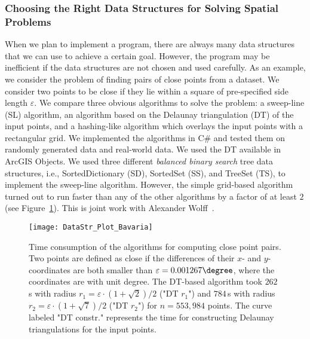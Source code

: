 \subsubsection{Choosing the Right Data Structures for Solving 
Spatial Problems}

When we plan to implement a program, 
there are always many data structures that
we can use to achieve a certain goal.
However, the program may be inefficient
if the data structures are not chosen and used carefully.
As an example, we consider the problem of 
finding pairs of close points from a dataset. 
We consider two points to be close 
if they lie within a square of pre-specified 
side length $\varepsilon$. 
We compare three obvious algorithms to solve the problem: 
a sweep-line (SL) algorithm, 
an algorithm based on the Delaunay triangulation (DT) 
of the input points, 
and a hashing-like algorithm 
which overlays the input points with a rectangular grid. 
We implemented the algorithms in C\# and tested them on 
randomly generated data and real-world data. 
We used the DT available in ArcGIS Objects. 
We used three different \emph{balanced binary search} 
tree data structures, 
i.e., SortedDictionary (SD), SortedSet (SS), and TreeSet (TS), 
to implement the sweep-line algorithm. 
However, the simple grid-based algorithm 
turned out to run faster than 
any of the other algorithms 
by a factor of at least $2$ 
(see Figure~\ref{fig:Intro_DataStructure}).
This is joint work with Alexander Wolff~\cite{Peng2014DataStr}.


\begin{figure}[tb]
	\centering
	\texttt{[image: DataStr\_Plot\_Bavaria]}
	\caption{Time consumption of the algorithms
		for computing close point pairs. 
		Two points are defined as close if the differences 
		of their $x$- and $y$- coordinates are both smaller than
		$\varepsilon=0.001267 \degree$,
		where the coordinates are with unit degree. 
		The DT-based algorithm took $262\,$s 
		with radius $r_1=\varepsilon \cdot (1+\sqrt{2})/2$ 
		("DT $r_1$") and $784\,$s 
		with radius $r_2=\varepsilon \cdot (1+\sqrt{7})/2$ 
		("DT $r_2$") for $n=553{,}984$ points.
		The curve labeled "DT constr." represents 
		the time for constructing 
		Delaunay triangulations for the input points.
	}
	\label{fig:Intro_DataStructure}
\end{figure}

